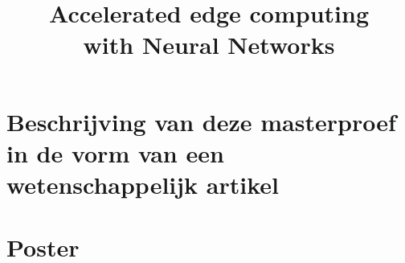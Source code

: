 \documentclass[11pt,a4paper,twoside,openright]{report}
\title{Accelerated edge computing\\ with Neural Networks}
\begin{document}

\preface









\appendix


\chapter{Beschrijving van deze masterproef in de vorm van een wetenschappelijk artikel}
%

\chapter{Poster}
%


\end{document}
